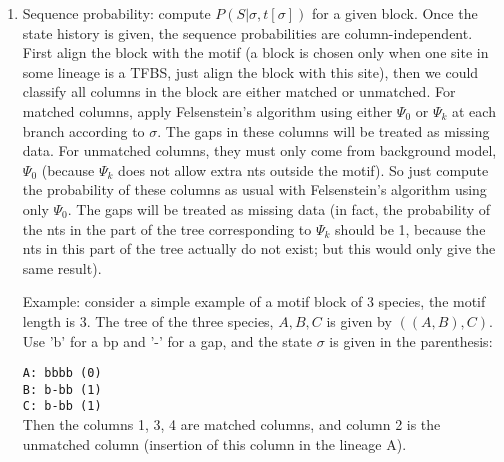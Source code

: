 \documentclass[11pt]{article}
\begin{document}
\begin{enumerate}
\begin{enumerate}
\item Sequence probability: compute $P(S|\sigma,t[\sigma])$ for a given block. Once the state history is given, the sequence probabilities are column-independent. First align the block with the motif (a block is chosen only when one site in some lineage is a TFBS, just align the block with this site), then we could classify all columns in the block are either matched or unmatched. For matched columns, apply Felsenstein's algorithm using either $\Psi_0$ or $\Psi_k$ at each branch according to $\sigma$. The gaps in these columns will be treated as missing data. For unmatched columns, they must only come from background model, $\Psi_0$ (because $\Psi_k$ does not allow extra nts outside the motif). So just compute the probability of these columns as usual with Felsenstein's algorithm using only $\Psi_0$. The gaps will be treated as missing data (in fact, the probability of the nts in the part of the tree corresponding to $\Psi_k$ should be 1, because the nts in this part of the tree actually do not exist; but this would only give the same result). 

Example: consider a simple example of a motif block of 3 species, the motif length is 3. The tree of the three species, $A,B,C$ is given by $((A,B),C)$. Use 'b' for a bp and '-' for a gap, and the state $\sigma$ is given in the parenthesis: 

\texttt{A: bbbb (0)}\\
\texttt{B: b-bb (1)}\\
\texttt{C: b-bb (1)}\\

Then the columns 1, 3, 4 are matched columns, and column 2 is the unmatched column (insertion of this column in the lineage A). 


\end{enumerate}
\end{enumerate}
\end{document}
